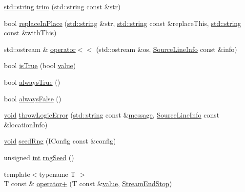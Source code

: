 \begin{DoxyCompactItemize}
\item 
\hyperlink{_s_d_l__opengl__glext_8h_ae84541b4f3d8e1ea24ec0f466a8c568b}{std\+::string} \hyperlink{namespace_catch_a084108b47f37d8bfd5db51c50c7451b3}{trim} (\hyperlink{_s_d_l__opengl__glext_8h_ae84541b4f3d8e1ea24ec0f466a8c568b}{std\+::string} const \&str)
\item 
bool \hyperlink{namespace_catch_afe4e6770da547e43e9e4eeaa05f946ea}{replace\+In\+Place} (\hyperlink{_s_d_l__opengl__glext_8h_ae84541b4f3d8e1ea24ec0f466a8c568b}{std\+::string} \&str, \hyperlink{_s_d_l__opengl__glext_8h_ae84541b4f3d8e1ea24ec0f466a8c568b}{std\+::string} const \&replace\+This, \hyperlink{_s_d_l__opengl__glext_8h_ae84541b4f3d8e1ea24ec0f466a8c568b}{std\+::string} const \&with\+This)
\item 
std\+::ostream \& \hyperlink{namespace_catch_a6ec18b5054d7fdfdde861c580b082995}{operator$<$$<$} (std\+::ostream \&os, \hyperlink{struct_catch_1_1_source_line_info}{Source\+Line\+Info} const \&info)
\item 
bool \hyperlink{namespace_catch_ae3bc6c6677e64e6eaa720dc3add31852}{is\+True} (bool \hyperlink{_s_d_l__opengl__glext_8h_a8ad81492d410ff2ac11f754f4042150f}{value})
\item 
bool \hyperlink{namespace_catch_a129be2186a2f6546206ec52c4bf2156f}{always\+True} ()
\item 
bool \hyperlink{namespace_catch_ad425271249dd02956a9709e78b8b2783}{always\+False} ()
\item 
\hyperlink{_s_d_l__opengles2__gl2ext_8h_ae5d8fa23ad07c48bb609509eae494c95}{void} \hyperlink{namespace_catch_a702b612f683d154c466ea8297ed4a20d}{throw\+Logic\+Error} (\hyperlink{_s_d_l__opengl__glext_8h_ae84541b4f3d8e1ea24ec0f466a8c568b}{std\+::string} const \&\hyperlink{_s_d_l__opengl__glext_8h_a7b6161cffb9b8aee272b3b916183d28c}{message}, \hyperlink{struct_catch_1_1_source_line_info}{Source\+Line\+Info} const \&location\+Info)
\item 
\hyperlink{_s_d_l__opengles2__gl2ext_8h_ae5d8fa23ad07c48bb609509eae494c95}{void} \hyperlink{namespace_catch_a161400810eb0995394d6d8d3cae821ad}{seed\+Rng} (I\+Config const \&config)
\item 
unsigned \hyperlink{_s_d_l__thread_8h_a6a64f9be4433e4de6e2f2f548cf3c08e}{int} \hyperlink{namespace_catch_acf5ea05e942d2d7fe79111e12754ed76}{rng\+Seed} ()
\item 
{\footnotesize template$<$typename T $>$ }\\T const \& \hyperlink{namespace_catch_a5e95b3c47a7618db3649dc39b0bb9004}{operator+} (T const \&\hyperlink{_s_d_l__opengl__glext_8h_a8ad81492d410ff2ac11f754f4042150f}{value}, \hyperlink{struct_catch_1_1_stream_end_stop}{Stream\+End\+Stop})

\end{DoxyCompactItemize}
